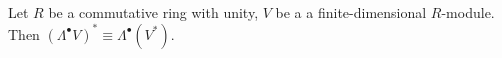 \begin{corollary}
  Let
    $R$ be a commutative ring with unity,
    $V$ be a a finite-dimensional $R$-module.
  Then $(\Lambda^\bullet V)^* \equiv \Lambda^\bullet (V^*)$.
\end{corollary}
